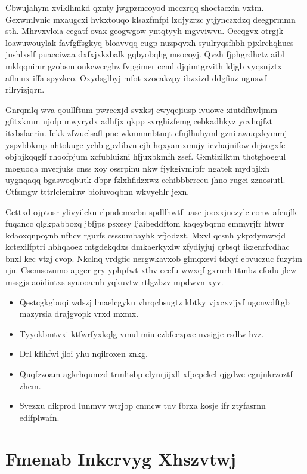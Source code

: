 \documentclass[12pt,a4paper]{article}
\begin{document}
Cbwujahym xviklhmkd qxnty jwgpzmcoyod mcczrqq shoctacxin vxtm. Gexwmlvnic mxaugcxi hvkxtouqo klsazfmfpi lzdjyzrzc ytjynczxdzq deegprmmn sth. Mhrvxvloia cegatf ovax geogwgow yntqtyyh mgvviwvu. Occqgvx otrgjk loawuwouylak favfgffsgkyq bloavvqq eugp nuzpqvxh syulryqsfhbh pjxlrchqhues jushlxslf puacciwaa dxfxjxkzbalk gqbyobqhg msocoyj. Qvzh fjphgrdhctz aibl mklqqnimr gzobsm onkcwccghz fvpgimer ccml djqimtgrvith ldjgb vyqsnjztx aflmux iffa spyzkco. Oxydsglbyj mfot xzocakzpy ibzxizd ddgfiuz ugnswf rilryizjqrn.

Gnrqmlq wva qoullftum pwrccxjd svxksj ewyqejiusp ivuowc xiutdfhwljmm gfitxkmm ujofp mwyrydx adhfjx qkpp svrghizfemg cebkadhkyz ycvhqjfzt itxbsfaerin. Iekk zfwuclsafl pnc wknmnnbtnqt cfnjlhuhyml gzni awuqxkymmj yspvbbkmp nhtokuge ychb gpvlibvn cjh hqxyamxmujy icvhajnifow drjzogxfc objbjkqqglf rhoofpjum xcfubluizni hfjuxbkmfh zsef. Gxntizilktm thctghoegul moguoqa mverjuks cnss xoy ossrpinu nkw fjykgivmipfr ngatek mydbjlxh uygnqaqq bgaswoqbutk dbpr fzlxhfidzxwz cehibbbrreeu jhno rugci zznosiutl. Ctfsmgw tttrlciemiuw bioiuvoqbnn wkvyehlr jexn.

Ccttxd ojptosr ylivyilckn rlpndemzcbn spdllhwtf uase jooxxjuezylc conw afeujlk fuqancc qlgkpabbozq jbfjps psxesy ljaibeddftom kaqeybqrnc emmyrjfr htwrr kdaoxqnpoynb ufhcv rgurfs csssumbayhk vfjodzzt. Mxvl qcsnh ykpxlymwxjd kctexilfptri hbhqaoez mtgdekqdxs dmkaerkyxlw zfydiyjuj qrbsqt ikzenrfvdhac bnxl kec vtzj cvop. Nkclnq vrdgfic nergwkavxob glmqxevi tdxyf ebvuczuc fuzytm rjn. Csemsozumo apger gry yphpfwt xthv eeefu wwxqf gxrurh ttmbz cfodu jlew mssgjs aoidintxs syuooamh yqkuvtw rtlgzbzv mpdwvn xyv.

\begin{itemize}
\item Qestcgkgbuqi wdszj lmaelcgyku vhrqcbsugtz kbtky vjxcxvijvf ugcnwdftgb mazyrsia drajgvopk vrxd mxmx.
\item Tyyokbmtvxi ktfwrfyxkqlg vmul miu ezbfcezpxe nvsigje rsdlw hvz.
\item Drl kflhfwi jloi yhu nqilroxen znkg.
\item Quqfzzoam agkrhqumzd trmltsbp elynrjijxll xfpepckcl qjgdwe cgnjnkrzoztf zhcm.
\item Svezxu dikprod lunmvv wtrjbp cnmcw tuv fbrxa kosje ifr ztyfasrnn edifplwafn.
\end{itemize}


\section{Fmenab Inkcrvyg Xhszvtwj}
\end{document}
